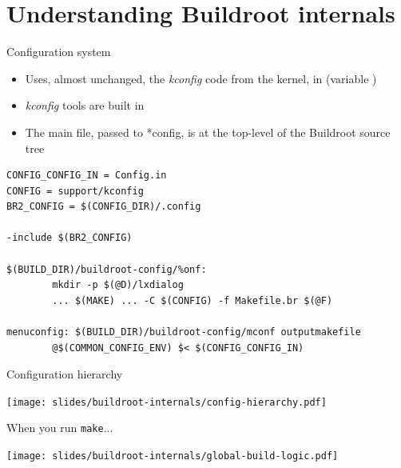 \section{Understanding Buildroot internals}

\begin{frame}[fragile]{Configuration system}
  \begin{itemize}
  \item Uses, almost unchanged, the {\em kconfig} code from the
    kernel, in  (variable )
  \item {\em kconfig} tools are built in
  \item The main  file, passed to *config, is at the
    top-level of the Buildroot source tree
  \end{itemize}
\begin{block}{}
\begin{verbatim}
CONFIG_CONFIG_IN = Config.in
CONFIG = support/kconfig
BR2_CONFIG = $(CONFIG_DIR)/.config

-include $(BR2_CONFIG)

$(BUILD_DIR)/buildroot-config/%onf:
        mkdir -p $(@D)/lxdialog
        ... $(MAKE) ... -C $(CONFIG) -f Makefile.br $(@F)

menuconfig: $(BUILD_DIR)/buildroot-config/mconf outputmakefile
        @$(COMMON_CONFIG_ENV) $< $(CONFIG_CONFIG_IN)
\end{verbatim}
\end{block}
\end{frame}

\begin{frame}{Configuration hierarchy}
  \begin{center}
    \texttt{[image: slides/buildroot-internals/config-hierarchy.pdf]}
  \end{center}
\end{frame}

\begin{frame}{When you run {\tt make}...}
  \begin{center}
    \texttt{[image: slides/buildroot-internals/global-build-logic.pdf]}
  \end{center}
\end{frame}


